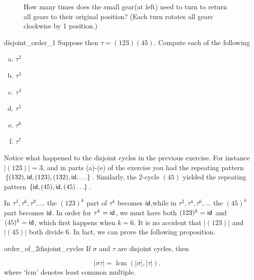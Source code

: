 \begin{figure}[htb]
	  \caption{\label{fig:wheels:2} How many times does the small gear(at left)  need to turn to return all gears to their original position? (Each turn rotates all  gears clockwise by 1 position.)}
\end{figure}
\begin{exercise}{disjoint_order_1}
Suppose then $\tau = (1 2 3)( 4 5)$. Compute each of the following
\begin{multicols}{3}
\begin{enumerate}[(a)]
\item 
$\tau^2$
\item 
$\tau^3$
\item 
$\tau^4$
\item 
$\tau^5$
\item 
$\tau^6$
\item
$\tau^7$
\end{enumerate}
\end{multicols}
\end{exercise}

\noindent
Notice what happened to the disjoint cycles in the previous exercise.  For instance $|(1 2 3)| = 3$, and in parts (a)-(e) of the exercise you had the repeating pattern $\{(1 3 2), {\sf{i}d}, (1 2 3), (1 3 2), {\sf{i}d}, \ldots\}$.  Similarly, the 2-cycle $(4 5)$ yielded the repeating pattern  $\{{\sf{i}d}, (4 5), {\sf{i}d}, (4 5) \ldots \}$.  

In $\tau^3, \tau^6, \tau^9, \ldots$  the $(1 2 3)^k$ part of $\tau^k$ becomes ${\sf{i}d} $,while in  $\tau^2, \tau^4, \tau^6, \ldots$ the $(4 5)^k$ part  becomes ${\sf{i}d} $.  In order for $\tau^k = {\sf{i}d} $, we must have both $(1 2 3)^k = {\sf{i}d} $ and $(4 5)^k = {\sf{i}d} $, which first happens when $k = 6$. It is no accident that $|(1 2 3)|$ and $|(4 5)|$ both divide 6. In fact,  we can prove  the following proposition.

\begin{prop}{order_of_2disjoint_cycles}
If $\sigma$ and $\tau$ are disjoint cycles, then 

$$|\sigma \tau| = \mbox{ lcm }(|\sigma|,|\tau|),$$
where `lcm' denotes least common multiple.
\end{prop}

